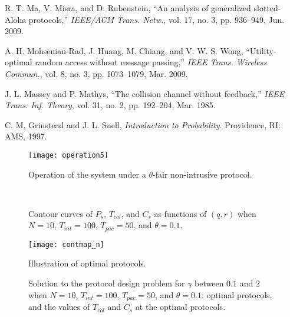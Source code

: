 \documentclass[12pt,draftclsnofoot,onecolumn]{IEEEtran}
\begin{document}
\begin{thebibliography}{99}
 R. T. Ma, V. Misra, and D. Rubenstein,
``An analysis of generalized slotted-Aloha protocols,''
\emph{IEEE/ACM Trans. Netw.}, vol. 17, no. 3, pp. 936--949, Jun. 2009.

 A. H. Mohsenian-Rad, J. Huang, M. Chiang, and V. W. S. Wong,
``Utility-optimal random access without message passing,'' \emph{IEEE
Trans. Wireless Commun.}, vol. 8, no. 3, pp. 1073--1079, Mar. 2009.

 J. L. Massey and P. Mathys, ``The collision channel without feedback,''
\emph{IEEE Trans. Inf. Theory}, vol. 31, no. 2, pp. 192--204, Mar. 1985.

 C. M. Grinstead and J. L. Snell, \emph{Introduction to Probability}.
Providence, RI: AMS, 1997.

\end{thebibliography}


\vfill

\begin{figure}[hb]
\begin{center}
\texttt{[image: operation5]}
\caption{Operation of the system under a $\theta$-fair non-intrusive protocol.}
\label{fig:oper}
\end{center}
\end{figure}

\begin{figure}\centering
{}\\
\caption{Contour curves of
$P_s$, $T_{col}$, and $C_s$ as functions of $(q,r)$
when $N = 10$, $T_{int} = 100$, $T_{pac} = 50$, and $\theta = 0.1$.}
\label{fig:contour}\end{figure}

\begin{figure}
\begin{center}
\texttt{[image: contmap\_n]}
\caption{Illustration of optimal protocols.}
\label{fig:contmap}
\end{center}
\end{figure}

\begin{figure}\centering
{}\caption{Solution to the protocol design problem
for $\gamma$ between $0.1$ and $2$ when $N = 10$, $T_{int} = 100$, $T_{pac} = 50$, and $\theta = 0.1$:
\protect{} optimal protocols, and
\protect{} the values of $T_{col}$ and $C_s$ at the optimal protocols.}
\label{fig:gvary}\end{figure}
\end{document}
